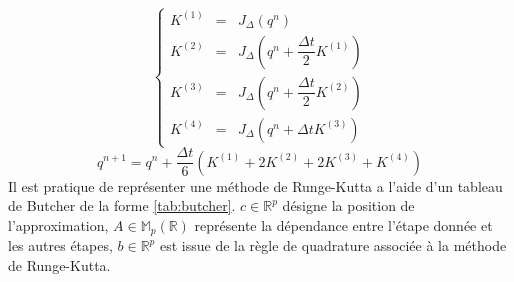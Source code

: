 \begin{equation}
\left\lbrace
\begin{array}{rcl}
K^{(1)} & = & J_{\Delta}(q^n) \\
K^{(2)} & = & J_{\Delta}\left(q^n + \dfrac{\Delta t}{2} K^{(1)}\right) \\
K^{(3)} & = & J_{\Delta}\left(q^n + \dfrac{\Delta t}{2} K^{(2)}\right) \\
K^{(4)} & = & J_{\Delta}\left(q^n + \Delta t K^{(3)}\right)
\end{array}
\right.
\label{eq:k_rk4}
\end{equation}
\begin{equation}
q^{n+1} = q^n + \dfrac{\Delta t}{6} \left( K^{(1)} + 2 K^{(2)} + 2 K^{(3)} + K^{(4)} \right)
\label{eq:assemblage_rk4}
\end{equation}
Il est pratique de représenter une méthode de Runge-Kutta a l'aide d'un tableau de Butcher \cite{Butcher2016} de la forme \ref{tab:butcher}. $c \in \mathbb{R}^p$ désigne la position de l'approximation, $A \in \mathbb{M}_p(\mathbb{R})$ représente la dépendance entre l'étape donnée et les autres étapes, $b \in \mathbb{R}^p$ est issue de la règle de quadrature associée à la méthode de Runge-Kutta.


